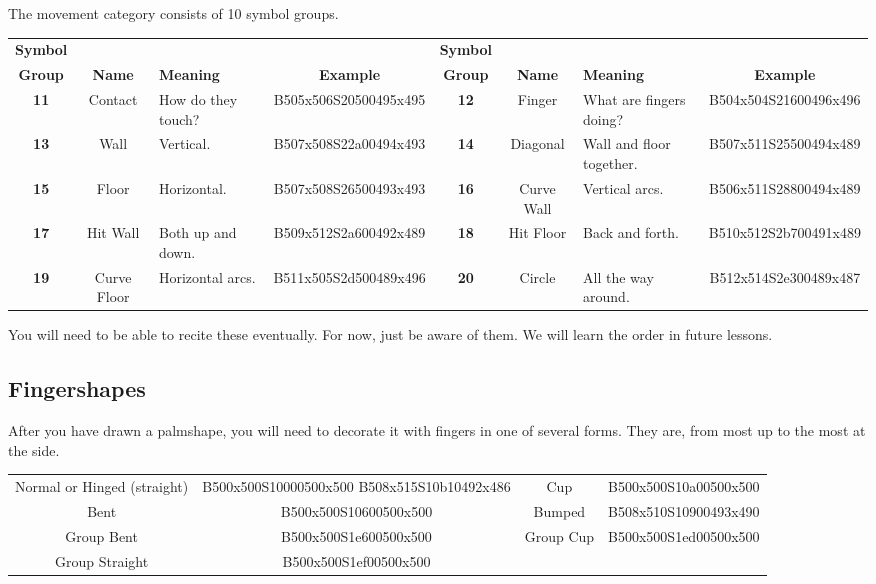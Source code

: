 \documentclass{article}
\begin{document}
The movement category consists of 10 symbol groups.

\begin{center}
\begin{tabular}{ccp{21mm}c@{\hskip 5mm}ccp{21mm}c}
\textbf{Symbol}&&&&\textbf{Symbol}\\
\textbf{Group}&\textbf{Name}&\textbf{Meaning}&\textbf{Example}&\textbf{Group}&\textbf{Name}&\textbf{Meaning}&\textbf{Example}\\
\textbf{11}&Contact    &How do they touch?&B505x506S20500495x495&\textbf{12}&Finger    &What are fingers doing? &B504x504S21600496x496\\
\textbf{13}&Wall       &Vertical.         &B507x508S22a00494x493&\textbf{14}&Diagonal  &Wall and floor together.&B507x511S25500494x489\\
\textbf{15}&Floor      &Horizontal.       &B507x508S26500493x493&\textbf{16}&Curve Wall&Vertical arcs.          &B506x511S28800494x489\\
\textbf{17}&Hit Wall   &Both up and down. &B509x512S2a600492x489&\textbf{18}&Hit Floor &Back and forth.         &B510x512S2b700491x489\\
\textbf{19}&Curve Floor&Horizontal arcs.  &B511x505S2d500489x496&\textbf{20}&Circle    &All the way around.     &B512x514S2e300489x487\\
\end{tabular}
\end{center}

You will need to be able to recite these eventually.
For now, just be aware of them.
We will learn the order in future lessons.

\subsection{Fingershapes}

After you have drawn a palmshape, you will need to decorate it with fingers in one of several forms.
They are, from most up to the most at the side.

\begin{center}
\begin{tabular}{cccc}
Normal or Hinged (straight)&B500x500S10000500x500 B508x515S10b10492x486&Cup      &B500x500S10a00500x500\\
Bent                       &B500x500S10600500x500                      &Bumped   &B508x510S10900493x490\\
Group Bent                 &B500x500S1e600500x500                      &Group Cup&B500x500S1ed00500x500\\
Group Straight             &B500x500S1ef00500x500\\
\end{tabular}
\end{center}
\end{document}
